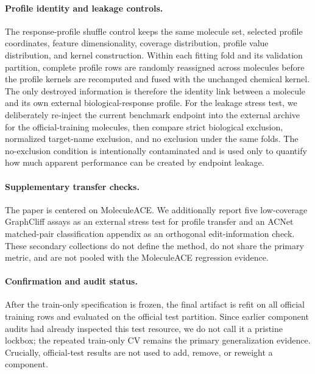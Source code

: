 \documentclass[manuscript,nonacm]{acmart}
\newcommand{\mace}{MoleculeACE\xspace}
\begin{document}
\paragraph{Profile identity and leakage controls.}
The response-profile shuffle control keeps the same molecule set, selected
profile coordinates, feature dimensionality, coverage distribution, profile
value distribution, and kernel construction. Within each fitting fold and its
validation partition, complete profile rows are randomly reassigned across
molecules before the profile kernels are recomputed and fused with the
unchanged chemical kernel. The only destroyed information is therefore the
identity link between a molecule and its own external biological-response
profile. For the leakage stress test, we deliberately re-inject the current
benchmark endpoint into the external archive for the official-training
molecules, then compare strict biological exclusion, normalized target-name
exclusion, and no exclusion under the same folds. The no-exclusion condition is
intentionally contaminated and is used only to quantify how much apparent
performance can be created by endpoint leakage.

\paragraph{Supplementary transfer checks.}
The paper is centered on \mace. We additionally report five low-coverage
GraphCliff assays as an external stress test for profile transfer and an ACNet
matched-pair classification appendix as an orthogonal edit-information check.
These secondary collections do not define the method, do not share the primary
metric, and are not pooled with the \mace regression evidence.

\paragraph{Confirmation and audit status.}
After the train-only specification is frozen, the final artifact is refit on
all official training rows and evaluated on the official test partition. Since
earlier component audits had already inspected this test resource, we do not call it
a pristine lockbox; the repeated train-only CV remains the primary
generalization evidence. Crucially, official-test results are not used to add,
remove, or reweight a component.
\end{document}

